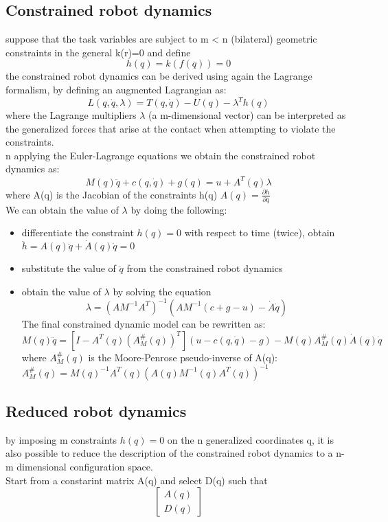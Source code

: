 \documentclass[a4paper,12pt]{article}
\begin{document}
\subsection{Constrained robot dynamics}
suppose that the task variables are subject to m < n (bilateral)
geometric constraints in the general k(r)=0 and define \begin{equation}
h(q)=k(f(q))=0
\end{equation}
the constrained robot dynamics can be derived using again the
Lagrange formalism, by defining an augmented Lagrangian as:
\begin{equation}
    L(q,\dot{q},\lambda)=T(q,\dot{q})-U(q)-\lambda^T h(q)
\end{equation}
where the Lagrange multipliers $\lambda$ (a m-dimensional vector) can
be interpreted as the generalized forces that arise at the contact
when attempting to violate the constraints.\\
n applying the Euler-Lagrange equations we obtain 
the constrained robot dynamics as:
\begin{equation}
    M(q)\ddot{q} + c(q,\dot{q}) + g(q) = u +A^T(q)\lambda
\end{equation}
where A(q) is the Jacobian of the constraints h(q) $A(q)=\frac{\partial h}{\partial q}$\\
We can obtain the value of $\lambda$ by doing the following:
\begin{itemize}
\item differentiate the constraint $h(q)=0$ with respect to time (twice),
obtain $\ddot{h}=A(q)\ddot{q}+\dot{A}(q)\dot{q}=0$
\item substitute the value of $\ddot{q}$ from the constrained robot dynamics
\item obtain the value of $\lambda$ by solving the equation 
\begin{equation}
    \lambda = (AM^{-1}A^T)^{-1}(AM^{-1}(c+g-u)-\dot{A}\dot{q})
\end{equation}
The final constrained dynamic model can be rewritten as:
\begin{equation}
    M(q)\ddot{q} = [I -A^T(q)(A_M^{\#}(q))^T](u-c(q,\dot{q})-g)-M(q)A_M^{\#}(q)\dot{A}(q)\dot{q}
\end{equation}
where $A_M^{\#}(q)$ is the Moore-Penrose pseudo-inverse of A(q):\\
$A_M^{\#}(q)=M(q)^{-1}A^T(q)(A(q)M^{-1}(q)A^T(q))^{-1}$
\end{itemize}
\subsection{Reduced robot dynamics}
by imposing m constraints $h(q)=0$ on the n generalized coordinates q,
it is also possible to reduce the description of the constrained robot
dynamics to a n-m dimensional configuration space.\\
Start from a constarint matrix A(q) and select D(q) such that
\begin{equation}
\begin{bmatrix}
    A(q)\\
    D(q)
\end{bmatrix}
\end{equation}
\end{document}
